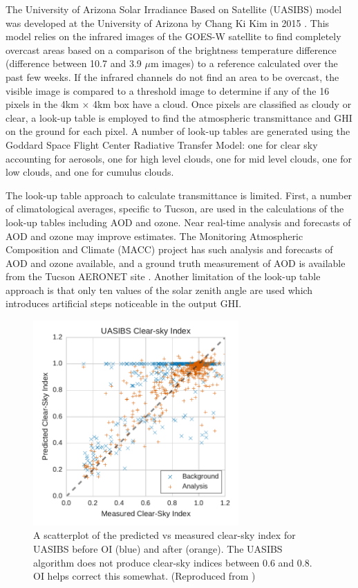 The University of Arizona Solar Irradiance Based on Satellite (UASIBS)
model was developed at the University of Arizona by Chang Ki Kim in
2015 \citep{Kim2016}.
This model relies on the infrared images of the GOES-W satellite to
find completely overcast areas based on a comparison of the brightness
temperature difference (difference between 10.7 and 3.9 $\mu$m
images) to a reference calculated over the past few weeks.
If the infrared channels do not find an area to be overcast, the
visible image is compared to a threshold image to determine if any of
the 16 pixels in the 4km $\times$ 4km box have a cloud.
Once pixels are classified as cloudy or clear, a look-up table is
employed to find the atmospheric transmittance and GHI on the ground
for each pixel.
A number of look-up tables are generated using the Goddard Space
Flight Center Radiative Transfer Model: one for clear sky
accounting for aerosols, one for high level clouds, one for mid level
clouds, one for low clouds, and one for cumulus clouds.

The look-up table approach to calculate transmittance is limited.
First, a number of climatological averages, specific to Tucson, are
used in the calculations of the look-up tables including AOD and
ozone.
Near real-time analysis and forecasts of AOD and ozone may improve
estimates.
The Monitoring Atmospheric Composition and Climate (MACC) project
\citep{Morcrette2009} has such analysis and forecasts of AOD and ozone
available, and a ground truth measurement of AOD is available from the
Tucson AERONET site \citep{Holben1998}.
Another limitation of the look-up table approach is that only ten
values of the solar zenith angle are used which introduces artificial
steps noticeable in the output GHI.

\begin{figure}[htb]
\centering
\includegraphics[width=0.7\textwidth]{figs/uasibs_scatter.pdf}
\caption[Scatterplot of predicted vs measured clear-sky index for
UASIBS]{A scatterplot of the predicted vs measured clear-sky index for
UASIBS before OI (blue) and after (orange). The UASIBS algorithm does
not produce clear-sky indices between 0.6 and 0.8. OI helps correct
this somewhat. (Reproduced from \cite{Lorenzo2017})}
\label{fig:uasibs_scatter}
\end{figure}

